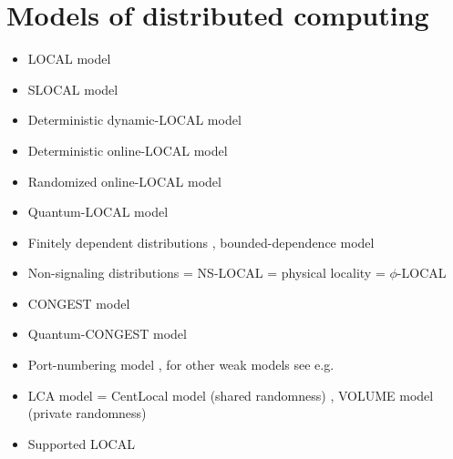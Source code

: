\documentclass[a4paper,11pt]{article}
\begin{document}
\section{Models of distributed computing}
\begin{itemize}
    \item LOCAL model \cite{linial-1992-locality-in-distributed-graph-algorithms,peleg-2000-distributed-computing-a-locality-sensitive}
    \item SLOCAL model \cite{ghaffari-kuhn-maus-2017-on-the-complexity-of-local}
    \item Deterministic dynamic-LOCAL model \cite{akbari-eslami-etal-2023-locality-in-online-dynamic}
    \item Deterministic online-LOCAL model \cite{akbari-eslami-etal-2023-locality-in-online-dynamic}
    \item Randomized online-LOCAL model \cite{akbari-coiteux-roy-etal-2025-online-locality-meets}
    \item Quantum-LOCAL model \cite{gavoille-kosowski-markiewicz-2009-what-can-be-observed,arfaoui-fraigniaud-2014-what-can-be-computed-without}
    \item Finitely dependent distributions \cite{burton-goulet-meester-1993-on-1-dependent-processes-and,holroyd-liggett-2016-finitely-dependent-coloring}, bounded-dependence model \cite{akbari-coiteux-roy-etal-2025-online-locality-meets}
    \item Non-signaling distributions = NS-LOCAL = physical locality = $\phi$-LOCAL \cite{gavoille-kosowski-markiewicz-2009-what-can-be-observed,arfaoui-fraigniaud-2014-what-can-be-computed-without}
    \item CONGEST model \cite{peleg-2000-distributed-computing-a-locality-sensitive}
    \item Quantum-CONGEST model \cite{elkin-klauck-etal-2014-can-quantum-communication-speed}
    \item Port-numbering model \cite{angluin-1980-local-and-global-properties-in-networks-of}, for other weak models see e.g.\ \cite{hella-jarvisalo-etal-2015-weak-models-of-distributed}
    \item LCA model = CentLocal model (shared randomness) \cite{rubinfeld-tamir-etal-2011-fast-local-computation}, VOLUME model (private randomness) \cite{rosenbaum-suomela-2020-seeing-far-vs-seeing-wide-volume}
    \item Supported LOCAL \cite{schmid-suomela-2013-exploiting-locality-in-distributed}
\end{itemize}
\end{document}
